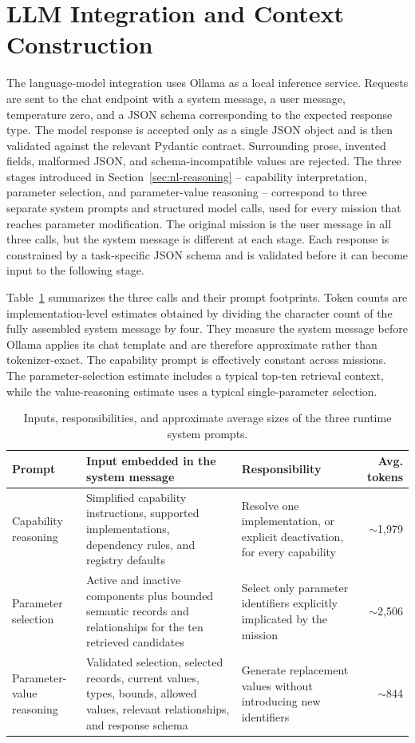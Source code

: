 \section{LLM Integration and Context Construction}
\label{sec:llm-integration}
The language-model integration uses Ollama as a local inference service. Requests are sent to the chat endpoint with a system message, a user message, temperature zero, and a JSON schema corresponding to the expected response type. The model response is accepted only as a single JSON object and is then validated against the relevant Pydantic contract. Surrounding prose, invented fields, malformed JSON, and schema-incompatible values are rejected.
The three stages introduced in Section~\ref{sec:nl-reasoning} -- capability interpretation, parameter selection, and parameter-value reasoning -- correspond to three separate system prompts and structured model calls, used for every mission that reaches parameter modification. The original mission is the user message in all three calls, but the system message is different at each stage. Each response is constrained by a task-specific JSON schema and is validated before it can become input to the following stage.

Table~\ref{tab:runtime-llm-prompts} summarizes the three calls and their prompt footprints. Token counts are implementation-level estimates obtained by dividing the character count of the fully assembled system message by four. They measure the system message before Ollama applies its chat template and are therefore approximate rather than tokenizer-exact. The capability prompt is effectively constant across missions. The parameter-selection estimate includes a typical top-ten retrieval context, while the value-reasoning estimate uses a typical single-parameter selection.

\begin{table}[htbp]
\centering
\caption{Inputs, responsibilities, and approximate average sizes of the three runtime system prompts.}
\label{tab:runtime-llm-prompts}
\small
\begin{tabular}{p{}p{}p{}r}
\hline
\textbf{Prompt} & \textbf{Input embedded in the system message} & \textbf{Responsibility} & \textbf{Avg. tokens} \\
\hline
Capability reasoning & Simplified capability instructions, supported implementations, dependency rules, and registry defaults & Resolve one implementation, or explicit deactivation, for every capability & $\sim$1,979 \\
Parameter selection & Active and inactive components plus bounded semantic records and relationships for the ten retrieved candidates & Select only parameter identifiers explicitly implicated by the mission & $\sim$2,506 \\
Parameter-value reasoning & Validated selection, selected records, current values, types, bounds, allowed values, relevant relationships, and response schema & Generate replacement values without introducing new identifiers & $\sim$844 \\
\hline
\end{tabular}
\end{table}

